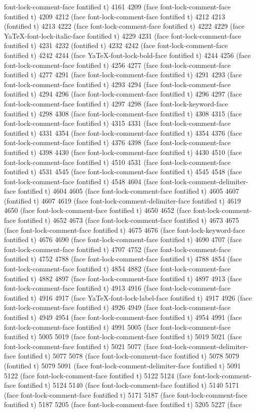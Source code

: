 {font-lock-comment-face fontified t) 4161 4209 (face font-lock-comment-face fontified t) 4209 4212 (face font-lock-comment-face fontified t) 4212 4213 (fontified t) 4213 4222 (face font-lock-comment-face fontified t) 4222 4229 (face YaTeX-font-lock-italic-face fontified t) 4229 4231 (face font-lock-comment-face fontified t) 4231 4232 (fontified t) 4232 4242 (face font-lock-comment-face fontified t) 4242 4244 (face YaTeX-font-lock-bold-face fontified t) 4244 4256 (face font-lock-comment-face fontified t) 4256 4277 (face font-lock-comment-face fontified t) 4277 4291 (face font-lock-comment-face fontified t) 4291 4293 (face font-lock-comment-face fontified t) 4293 4294 (face font-lock-comment-face fontified t) 4294 4296 (face font-lock-comment-face fontified t) 4296 4297 (face font-lock-comment-face fontified t) 4297 4298 (face font-lock-keyword-face fontified t) 4298 4308 (face font-lock-comment-face fontified t) 4308 4315 (face font-lock-comment-face fontified t) 4315 4331 (face font-lock-comment-face fontified t) 4331 4354 (face font-lock-comment-face fontified t) 4354 4376 (face font-lock-comment-face fontified t) 4376 4398 (face font-lock-comment-face fontified t) 4398 4430 (face font-lock-comment-face fontified t) 4430 4510 (face font-lock-comment-face fontified t) 4510 4531 (face font-lock-comment-face fontified t) 4531 4545 (face font-lock-comment-face fontified t) 4545 4548 (face font-lock-comment-face fontified t) 4548 4604 (face font-lock-comment-delimiter-face fontified t) 4604 4605 (face font-lock-comment-face fontified t) 4605 4607 (fontified t) 4607 4619 (face font-lock-comment-delimiter-face fontified t) 4619 4650 (face font-lock-comment-face fontified t) 4650 4652 (face font-lock-comment-face fontified t) 4652 4673 (face font-lock-comment-face fontified t) 4673 4675 (face font-lock-comment-face fontified t) 4675 4676 (face font-lock-keyword-face fontified t) 4676 4690 (face font-lock-comment-face fontified t) 4690 4707 (face font-lock-comment-face fontified t) 4707 4752 (face font-lock-comment-face fontified t) 4752 4788 (face font-lock-comment-face fontified t) 4788 4854 (face font-lock-comment-face fontified t) 4854 4882 (face font-lock-comment-face fontified t) 4882 4897 (face font-lock-comment-face fontified t) 4897 4913 (face font-lock-comment-face fontified t) 4913 4916 (face font-lock-comment-face fontified t) 4916 4917 (face YaTeX-font-lock-label-face fontified t) 4917 4926 (face font-lock-comment-face fontified t) 4926 4949 (face font-lock-comment-face fontified t) 4949 4954 (face font-lock-comment-face fontified t) 4954 4991 (face font-lock-comment-face fontified t) 4991 5005 (face font-lock-comment-face fontified t) 5005 5019 (face font-lock-comment-face fontified t) 5019 5021 (face font-lock-comment-face fontified t) 5021 5077 (face font-lock-comment-delimiter-face fontified t) 5077 5078 (face font-lock-comment-face fontified t) 5078 5079 (fontified t) 5079 5091 (face font-lock-comment-delimiter-face fontified t) 5091 5122 (face font-lock-comment-face fontified t) 5122 5124 (face font-lock-comment-face fontified t) 5124 5140 (face font-lock-comment-face fontified t) 5140 5171 (face font-lock-comment-face fontified t) 5171 5187 (face font-lock-comment-face fontified t) 5187 5205 (face font-lock-comment-face fontified t) 5205 5227 (face }
